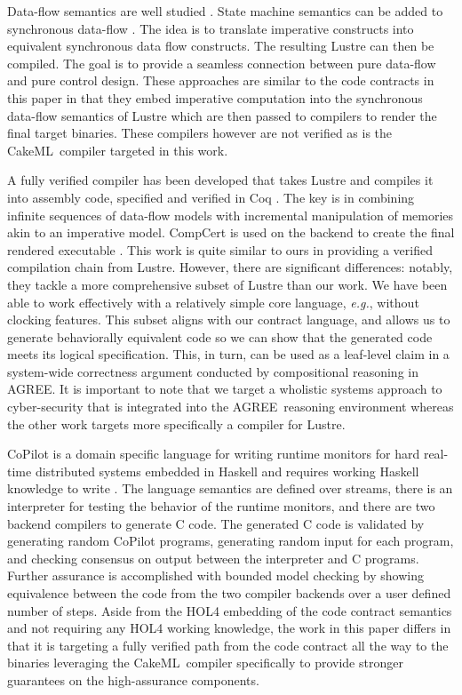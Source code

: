 \documentclass[global,twocolumn]{svjour}
\newcommand{\agr}{AGREE}
\newcommand{\ckml}{CakeML}
\newcommand{\eg}{\textit{e.g.}}
\begin{document}
Data-flow semantics are well studied \cite{10.1145/41625.41641,97300, 10.1145/1379023.1375674,10.1145/2345141.2248426,10.1007/978-3-540-45212-6_10}.
%
State machine semantics can be added to synchronous data-flow \cite{10.1145/1086228.1086261}.
%
The idea is to translate imperative constructs into equivalent synchronous data flow constructs.
%
The resulting Lustre can then be compiled. The goal is to provide a seamless connection between pure data-flow and pure control design.
%
These approaches are similar to the code contracts in this paper in that they embed imperative computation into the synchronous data-flow semantics of Lustre which are then passed to compilers to render the final target binaries.
%
These compilers however are not verified as is the \ckml\ compiler targeted in this work.

A fully verified compiler has been developed that takes Lustre and compiles it into assembly code, specified and verified in Coq \cite{10.1145/3140587.3062358}.
%
The key is in combining infinite sequences of data-flow models with incremental manipulation of memories akin to an imperative model.
%
CompCert is used on the backend to create the final rendered executable \cite{compcert}.
%
This work is quite similar to ours in providing a verified compilation chain from Lustre.
%
However, there are significant differences: notably, they tackle a more comprehensive subset of Lustre than our work.
%
We have been able to work effectively with a relatively simple core language, \eg, without clocking features.
%
This subset aligns with our contract language, and allows us to generate behaviorally equivalent code so we can show that the generated code meets its logical specification.
%
This, in turn, can be used as a leaf-level claim in a system-wide correctness argument conducted by compositional reasoning in \agr.
%
It is important to note that we target a wholistic systems approach to cyber-security that is integrated into the \agr\ reasoning environment whereas the other work targets more specifically a compiler for Lustre.

CoPilot is a domain specific language for writing runtime monitors for hard real-time distributed systems embedded in Haskell and requires working Haskell knowledge to write \cite{10.1007/s11334-013-0223-x}.
%
The language semantics are defined over streams, there is an interpreter for testing the behavior of the runtime monitors, and there are two backend compilers to generate C code.
%
The generated C code is validated by generating random CoPilot programs, generating random input for each program, and checking consensus on output between the interpreter and C programs.
%
Further assurance is accomplished with bounded model checking by showing equivalence between the code from the two compiler backends over a user defined number of steps.
%
Aside from the HOL4 embedding of the code contract semantics and not requiring any HOL4 working knowledge, the work in this paper differs in that it is targeting a fully verified path from the code contract all the way to the binaries leveraging the \ckml\ compiler specifically to provide stronger guarantees on the high-assurance components.
\end{document}
